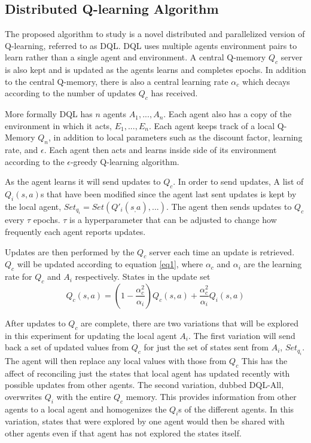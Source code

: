 \documentclass[jair,twoside,11pt,theapa]{article}
\begin{document}
\subsection{Distributed Q-learning Algorithm} 
\label{algorithm}
The proposed algorithm to study is a novel distributed and parallelized version of Q-learning, referred to as DQL. 
DQL uses multiple agents environment pairs to learn rather than a single agent and environment. A central Q-memory $Q_c$ server is also kept and is updated 
as the agents learns and completes epochs. In addition to the central Q-memory, there is also a central learning rate $\alpha_c$ which decays according
to the number of updates $Q_c$ has received. 

More formally DQL has $n$ agents $A_1, ... , A_n$. Each agent also has a copy of the environment in which it acts, $E_1, ..., E_n$. Each agent keeps track 
of a local Q-Memory $Q_n$, in addition to local parameters such as the discount factor, learning rate, and $\epsilon$. Each agent then acts and learns inside side of
its environment according to the $\epsilon$-greedy Q-learning algorithm. 

As the agent learns it will send updates to $Q_c$. In order to send updates, A list of $Q_i(s,a)$s that have been modified since the agent last sent updates is kept by the local agent,
$Set_{q_i} = Set(Q'_i(s_,a), ... )$.
The agent then sends updates to $Q_c$ every $\tau$ epochs. $\tau$ is a hyperparameter that can be adjusted to change how frequently each agent reports updates. 

Updates are then performed by the $Q_c$ server each time an update is retrieved. $Q_c$ will be updated according to equation \ref{eq1},
where $\alpha_{c}$ and $\alpha_i$ are the learning rate for $Q_c$ and $A_i$ respectively. States in the update set 
\begin{equation}
\label{eq1}
Q_c(s,a) = (1-\frac{\alpha_{c}^{2}}{\alpha_i})Q_c(s,a) + \frac{\alpha_{c}^{2}}{\alpha_i} Q_i(s,a)
\end{equation}

After updates to $Q_c$ are complete, there are two variations that will be explored in this experiment for updating the local agent $A_i$. 
The first variation will send back a set of updated values from $Q_c$ for just the set of states sent from $A_i$, $Set_{q_i}$. The agent will 
then replace any local values with those from $Q_c$ This has the affect of reconciling just the states that local agent has updated recently 
with possible updates from other agents. 
The second variation, dubbed DQL-All, overwrites $Q_i$ with the entire $Q_c$ memory. This provides information from other agents to a local agent and homogenizes 
the $Q_i$s of the different agents. In this variation, states that were explored by one agent would then be shared with other agents even if that 
agent has not explored the states itself. 
\end{document}

